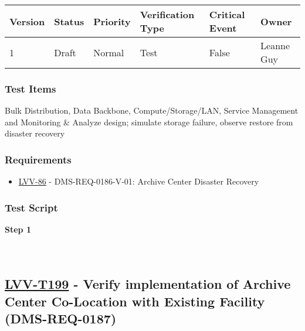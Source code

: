 \begin{longtable}[]{@{}llllll@{}}
\toprule
Version & Status & Priority & Verification Type & Critical Event &
Owner\tabularnewline
\midrule
\endhead
1 & Draft & Normal & Test & False & Leanne Guy\tabularnewline
\bottomrule
\end{longtable}

\hypertarget{test-items-98}{%
\subsubsection{Test Items}\label{test-items-98}}

Bulk Distribution, Data Backbone, Compute/Storage/LAN, Service
Management and Monitoring \& Analyze design; simulate storage failure,
observe restore from disaster recovery

\hypertarget{requirements-98}{%
\subsubsection{Requirements}\label{requirements-98}}

\begin{itemize}
\tightlist
\item
  \href{https://jira.lsstcorp.org/browse/LVV-86}{LVV-86} -
  DMS-REQ-0186-V-01: Archive Center Disaster Recovery
\end{itemize}

\hypertarget{test-script-98}{%
\subsubsection{Test Script}\label{test-script-98}}

\textbf{Step 1}\\
~\\
~\\

\hypertarget{lvv-t199---verify-implementation-of-archive-center-co-location-with-existing-facility-dms-req-0187}{%
\subsection{\texorpdfstring{\href{https://jira.lsstcorp.org/secure/Tests.jspa\#/testCase/LVV-T199}{LVV-T199}
- Verify implementation of Archive Center Co-Location with Existing
Facility
(DMS-REQ-0187)}{LVV-T199 - Verify implementation of Archive Center Co-Location with Existing Facility (DMS-REQ-0187)}}\label{lvv-t199---verify-implementation-of-archive-center-co-location-with-existing-facility-dms-req-0187}}

